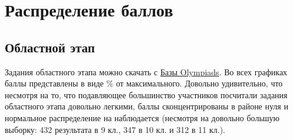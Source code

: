 \section{Распределение баллов}

\subsection{Областной этап}
Задания областного этапа можно скачать с \href{https://olympiads.bc-pf.org/chemistry/oblast/2023}{Базы Olympiads}. Во всех графиках баллы представлены в виде \% от максимального. Довольно удивительно, что несмотря на то, что подавляющее большинство участников посчитали задания областного этапа довольно легкими, баллы сконцентрированы в районе нуля и нормальное распределение на наблюдается (несмотря на довольно большую выборку: 432 результата в 9 кл., 347 в 10 кл. и 312 в 11 кл.).

